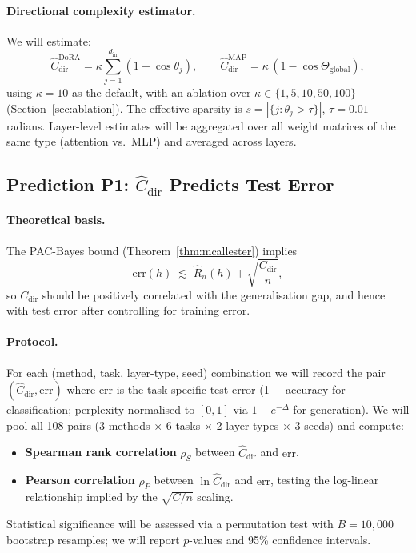 \documentclass[11pt]{article}
\begin{document}
\paragraph{Directional complexity estimator.}
We will estimate:
\[
  \widehat{C}^{\mathrm{DoRA}}_{\mathrm{dir}}
    = \kappa \sum_{j=1}^{d_{\mathrm{in}}} (1 - \cos\theta_j),
  \qquad
  \widehat{C}^{\mathrm{MAP}}_{\mathrm{dir}}
    = \kappa\,(1 - \cos\Theta_{\mathrm{global}}),
\]
using $\kappa = 10$ as the default, with an ablation over
$\kappa \in \{1, 5, 10, 50, 100\}$ (Section~\ref{sec:ablation}).
The effective sparsity is $s = |\{j : \theta_j > \tau\}|$,
$\tau = 0.01$ radians.
Layer-level estimates will be aggregated over all weight matrices of the
same type (attention vs.\ MLP) and averaged across layers.

\subsection{Prediction P1: $\widehat{C}_{\mathrm{dir}}$ Predicts Test Error}
\label{sec:kl_predict}

\paragraph{Theoretical basis.}
The PAC-Bayes bound (Theorem~\ref{thm:mcallester}) implies
\[
  \mathrm{err}(h) \;\lesssim\; \hat{R}_n(h) + \sqrt{\frac{C_{\mathrm{dir}}}{n}},
\]
so $C_{\mathrm{dir}}$ should be positively correlated with the
generalisation gap, and hence with test error after controlling for
training error.

\paragraph{Protocol.}
For each (method, task, layer-type, seed) combination we will record the
pair $(\widehat{C}_{\mathrm{dir}}, \mathrm{err})$ where $\mathrm{err}$ is
the task-specific test error (1 $-$ accuracy for classification; perplexity
normalised to $[0,1]$ via $1 - e^{-\Delta}$ for generation).
We will pool all 108 pairs
(3 methods $\times$ 6 tasks $\times$ 2 layer types $\times$ 3 seeds)
and compute:
\begin{itemize}
  \item \textbf{Spearman rank correlation} $\rho_S$ between
    $\widehat{C}_{\mathrm{dir}}$ and $\mathrm{err}$.
  \item \textbf{Pearson correlation} $\rho_P$ between
    $\ln\widehat{C}_{\mathrm{dir}}$ and $\mathrm{err}$, testing the
    log-linear relationship implied by the $\sqrt{C/n}$ scaling.
\end{itemize}
Statistical significance will be assessed via a permutation test with
$B = 10{,}000$ bootstrap resamples; we will report $p$-values and
95\% confidence intervals.
\end{document}
